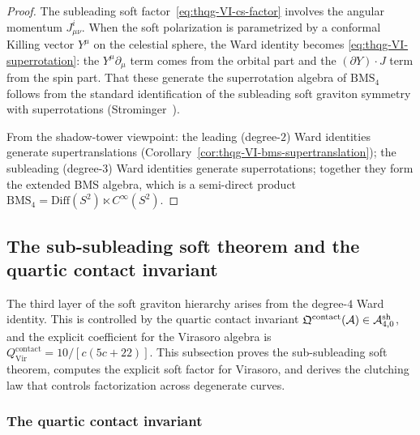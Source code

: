 \begin{proof}
The subleading soft factor~\eqref{eq:thqg-VI-cs-factor} involves
the angular momentum $J^i_{\mu\nu}$. When the soft polarization
is parametrized by a conformal Killing vector $Y^\mu$ on the
celestial sphere, the Ward identity becomes
\eqref{eq:thqg-VI-superrotation}: the $Y^\mu\partial_\mu$ term
comes from the orbital part and the $(\partial Y)\cdot J$ term
from the spin part. That these generate the superrotation
algebra of $\mathrm{BMS}_4$ follows from the standard
identification of the subleading soft graviton symmetry with
superrotations (Strominger~\cite{Strominger18}).

From the shadow-tower viewpoint: the leading (degree-$2$) Ward
identities generate supertranslations
(Corollary~\ref{cor:thqg-VI-bms-supertranslation}); the
subleading (degree-$3$) Ward identities generate superrotations;
together they form the extended BMS algebra, which is a
semi-direct product $\mathrm{BMS}_4 = \mathrm{Diff}(S^2) \ltimes
C^\infty(S^2)$.
\end{proof}

%
%

\subsection{The sub-subleading soft theorem and the quartic contact
invariant}
\label{subsec:thqg-VI-sub-subleading-soft}

The third layer of the soft graviton hierarchy arises from the
degree-$4$ Ward identity. This is controlled by the quartic
contact invariant
$\mathfrak{Q}^{\mathrm{contact}}(\mathcal{A}) \in \mathcal{A}^{\mathrm{sh}}_{4,0}$,
and the explicit coefficient for the Virasoro algebra is
$Q^{\mathrm{contact}}_{\mathrm{Vir}} = 10/[c(5c+22)]$. This
subsection proves the sub-subleading soft theorem, computes the
explicit soft factor for Virasoro, and derives the clutching law
that controls factorization across degenerate curves.

\subsubsection{The quartic contact invariant}

